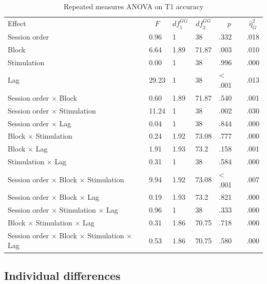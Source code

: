 \documentclass[11pt,]{memoir}
\makeatletter
\newcommand\LastLTentrywidth{1em}
\newlength\longtablewidth
\newcommand{\getlongtablewidth}{\begingroup \ifcsname LT@\roman{LT@tables}\endcsname \global\longtablewidth=0pt \renewcommand{\LT@entry}[2]{\global\advance\longtablewidth by ##2\relax\gdef\LastLTentrywidth{##2}}\@nameuse{LT@\roman{LT@tables}} \fi \endgroup}
\makeatother
\begin{document}
\begin{center}
\begin{ThreePartTable}
\small{
\begin{longtable}{llllll}\noalign{\getlongtablewidth\global\LTcapwidth=\longtablewidth}
\caption{\label{tab:tab-anova-T1}Repeated measures ANOVA on T1 accuracy}\\
\toprule
Effect & \multicolumn{1}{c}{$F$} & \multicolumn{1}{c}{$\mathit{df}_1^{GG}$} & \multicolumn{1}{c}{$\mathit{df}_2^{GG}$} & \multicolumn{1}{c}{$p$} & \multicolumn{1}{c}{$\hat{\eta}^2_G$}\\
\midrule
Session order & 0.96 & 1 & 38 & .332 & .018\\
Block & 6.64 & 1.89 & 71.87 & .003 & .010\\
Stimulation & 0.00 & 1 & 38 & .996 & .000\\
Lag & 29.23 & 1 & 38 & < .001 & .013\\
Session order $\times$ Block & 0.60 & 1.89 & 71.87 & .540 & .001\\
Session order $\times$ Stimulation & 11.24 & 1 & 38 & .002 & .030\\
Session order $\times$ Lag & 0.04 & 1 & 38 & .844 & .000\\
Block $\times$ Stimulation & 0.24 & 1.92 & 73.08 & .777 & .000\\
Block $\times$ Lag & 1.91 & 1.93 & 73.2 & .158 & .001\\
Stimulation $\times$ Lag & 0.31 & 1 & 38 & .584 & .000\\
Session order $\times$ Block $\times$ Stimulation & 9.94 & 1.92 & 73.08 & < .001 & .007\\
Session order $\times$ Block $\times$ Lag & 0.19 & 1.93 & 73.2 & .821 & .000\\
Session order $\times$ Stimulation $\times$ Lag & 0.96 & 1 & 38 & .333 & .000\\
Block $\times$ Stimulation $\times$ Lag & 0.31 & 1.86 & 70.75 & .718 & .000\\
Session order $\times$ Block $\times$ Stimulation $\times$ Lag & 0.53 & 1.86 & 70.75 & .580 & .000\\
\bottomrule
\end{longtable}
}
\end{ThreePartTable}
\end{center}

\endgroup

\hypertarget{individual-differences}{%
\subsection{Individual differences}\label{individual-differences}}
\end{document}
